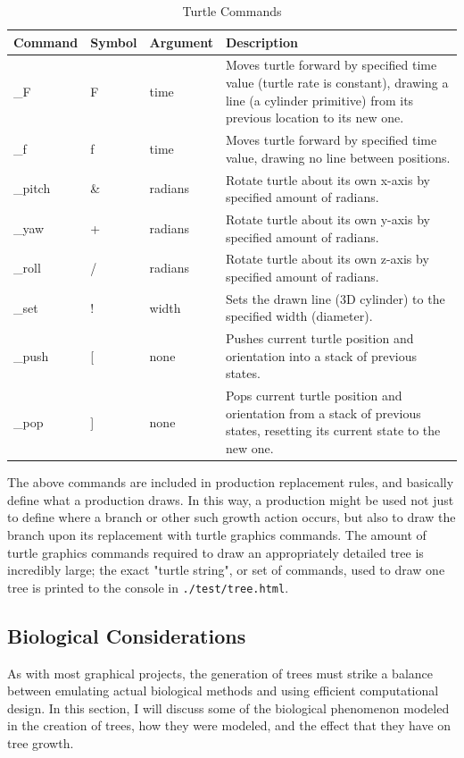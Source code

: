 \documentclass{article}
\newcommand{\tab}{\hspace*{2em}}
\begin{document}
\begin{table}[h]
\centering
\begin{tabular}{|l|l|l|p{7cm}|}
    \hline
    Command & Symbol & Argument & Description \\ \hline \hline
    \_F & F & time & Moves turtle forward by specified time value (turtle rate is constant),
        drawing a line (a cylinder primitive) from its previous location to its new one. \\\hline
    \_f & f & time & Moves turtle forward by specified time value, drawing no line between
        positions. \\\hline
    \_pitch & \& & radians & Rotate turtle about its own x-axis by specified amount of
        radians. \\\hline
    \_yaw & + & radians & Rotate turtle about its own y-axis by specified amount of
        radians. \\\hline
    \_roll & / & radians & Rotate turtle about its own z-axis by specified amount of
        radians. \\\hline
    \_set & ! & width & Sets the drawn line (3D cylinder) to the specified width
        (diameter). \\\hline
    \_push & [ & none & Pushes current turtle position and orientation into a stack of previous
        states. \\\hline
    \_pop & ] & none & Pops current turtle position and orientation from a stack of previous
        states, resetting its current state to the new one. \\ \hline

\end{tabular}
\caption[Turtle Commands]{Turtle Commands}
\label{tab:turtle}
\end{table}
    \tab The above commands are included in production replacement rules, and basically define what
a production draws. In this way, a production might be used not just to define where a branch or
other such growth action occurs, but also to draw the branch upon its replacement with turtle
graphics commands. The amount of turtle graphics commands required to draw an appropriately
detailed tree is incredibly large; the exact "turtle string", or set of commands, used to draw one
tree is printed to the console in \verb|./test/tree.html|.

        \subsection{Biological Considerations}
    \tab As with most graphical projects, the generation of trees must strike a balance between
emulating actual biological methods and using efficient computational design. In this section, I
will discuss some of the biological phenomenon modeled in the creation of trees, how they were
modeled, and the effect that they have on tree growth. 
\end{document}
